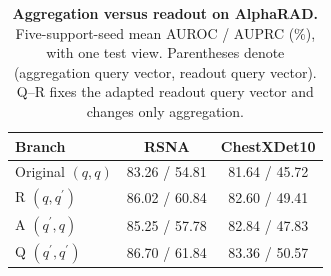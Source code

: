 \begin{table}[t]
\centering
\caption{\textbf{Aggregation versus readout on AlphaRAD.} Five-support-seed mean AUROC / AUPRC (\%), with one test view. Parentheses denote (aggregation query vector, readout query vector). Q--R fixes the adapted readout query vector and changes only aggregation.}
\label{tab:paths}
\small
\begin{tabular}{@{}lcc@{}}
\toprule
Branch & RSNA & ChestXDet10 \\
\midrule
Original $(q,q)$ & 83.26 / 54.81 & 81.64 / 45.72 \\
R $(q,q^{\prime})$ & 86.02 / 60.84 & 82.60 / 49.41 \\
A $(q^{\prime},q)$ & 85.25 / 57.78 & 82.84 / 47.83 \\
Q $(q^{\prime},q^{\prime})$ & 86.70 / 61.84 & 83.36 / 50.57 \\
\bottomrule
\end{tabular}
\end{table}
